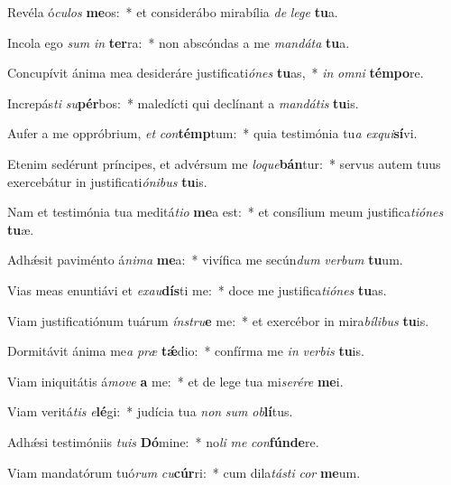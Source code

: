 \item Revéla ó\textit{cu}\textit{los} \textbf{me}os:~* et considerábo mirabília \textit{de} \textit{le}\textit{ge} \textbf{tu}a.
\item Incola ego \textit{sum} \textit{in} \textbf{ter}ra:~* non abscóndas a me \textit{man}\textit{dá}\textit{ta} \textbf{tu}a.
\item Concupívit ánima mea desideráre justificati\textit{ó}\textit{nes} \textbf{tu}as,~* \textit{in} \textit{om}\textit{ni} \textbf{tém}\textbf{po}re.
\item Increpás\textit{ti} \textit{su}\textbf{pér}bos:~* maledícti qui declínant a \textit{man}\textit{dá}\textit{tis} \textbf{tu}is.
\item Aufer a me oppróbrium, \textit{et} \textit{con}\textbf{témp}tum:~* quia testimónia tu\textit{a} \textit{ex}\textit{qui}\textbf{sí}vi.
\item Etenim sedérunt príncipes, et advérsum me \textit{lo}\textit{que}\textbf{bán}tur:~* servus autem tuus exercebátur in justificati\textit{ó}\textit{ni}\textit{bus} \textbf{tu}is.
\item Nam et testimónia tua meditá\textit{ti}\textit{o} \textbf{me}a est:~* et consílium meum justifica\textit{ti}\textit{ó}\textit{nes} \textbf{tu}æ.
\item Adhǽsit paviménto á\textit{ni}\textit{ma} \textbf{me}a:~* vivífica me secún\textit{dum} \textit{ver}\textit{bum} \textbf{tu}um.
\item Vias meas enuntiávi et \textit{ex}\textit{au}\textbf{dís}ti me:~* doce me justifica\textit{ti}\textit{ó}\textit{nes} \textbf{tu}as.
\item Viam justificatiónum tuárum \textit{ín}\textit{stru}\textbf{e} me:~* et exercébor in mira\textit{bí}\textit{li}\textit{bus} \textbf{tu}is.
\item Dormitávit ánima me\textit{a} \textit{præ} \textbf{tǽ}dio:~* confírma me \textit{in} \textit{ver}\textit{bis} \textbf{tu}is.
\item Viam iniquitátis á\textit{mo}\textit{ve} \textbf{a} me:~* et de lege tua mi\textit{se}\textit{ré}\textit{re} \textbf{me}i.
\item Viam veritá\textit{tis} \textit{e}\textbf{lé}gi:~* judícia tua \textit{non} \textit{sum} \textit{ob}\textbf{lí}tus.
\item Adhǽsi testimóniis \textit{tu}\textit{is} \textbf{Dó}mine:~* no\textit{li} \textit{me} \textit{con}\textbf{fún}\textbf{de}re.
\item Viam mandatórum tuó\textit{rum} \textit{cu}\textbf{cúr}ri:~* cum dila\textit{tás}\textit{ti} \textit{cor} \textbf{me}um.

